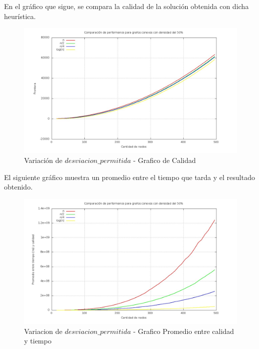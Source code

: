En el gráfico que sigue, se compara la calidad de la solución obtenida con dicha heurística.
\begin{figure}[H] %
\begin{center}
\includegraphics[width=400pt]{../imgs/variacioncalidad_tabu.jpg}
\caption{Variación de $desviacion\_permitida$ - Grafico de Calidad}
\end{center}
\end{figure}

El siguiente gráfico muestra un promedio entre el tiempo que tarda y el resultado obtenido.

\begin{figure}[H] %
\begin{center}
\includegraphics[width=400pt]{../imgs/variacionpromedio_tabu.jpg}
\caption{Variacion de $desviacion\_permitida$ - Grafico Promedio entre calidad y tiempo}
\end{center}
\end{figure}

